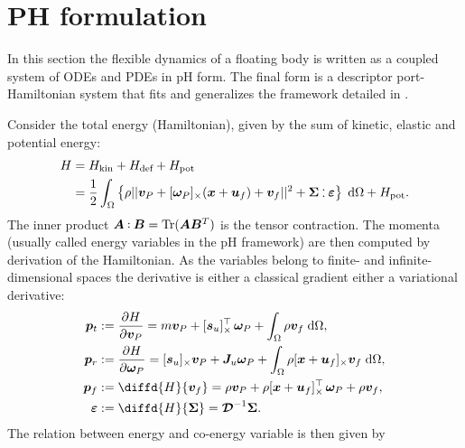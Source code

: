 \documentclass{svjour3}                     %
\DeclareMathOperator{\Tr}{Tr}
\newcommand{\crmat}[1]{\ensuremath{[#1]_{\times}}}
\def\onedot{$\mathsurround0pt\ldotp$}
\def\cddot{%
	\mathbin{\vcenter{\baselineskip.67ex
			\hbox{\onedot}\hbox{\onedot}}%
}}
\begin{document}
\section{PH formulation}
\label{sec:pH_fd}
In this section the flexible dynamics of a floating body is written as a coupled system of ODEs and PDEs in pH form. The final form is a descriptor port-Hamiltonian system that fits and generalizes the framework detailed in \cite{mehrmann2019structurepreserving}.  

Consider the total energy (Hamiltonian), given by the sum of kinetic, elastic and potential energy:
\begin{equation}
\begin{aligned}
H &= H_{\text{kin}} + H_{\text{def}} + H_{\text{pot}} \\
&= \frac{1}{2} \int_{\Omega} \left\{\rho ||\bm{v}_P + \crmat{\bm{\omega}_P} (\bm{x}+\bm{u}_f) + {\bm{v}}_f||^2 + \bm\Sigma \cddot \bm\varepsilon \right\}  \d{\Omega} + H_{\text{pot}}.
\end{aligned}
\end{equation}
The inner product $\bm{A} \cddot \bm{B} = \Tr(\bm{A} \bm{B}^T)$ is the tensor contraction.  
The momenta (usually called energy variables in the pH framework) are then computed by derivation of the Hamiltonian. As the variables belong to finite- and infinite-dimensional spaces the derivative is either a classical gradient either a variational derivative:
\begin{equation}
\label{eq:momenta}
\begin{aligned}
\bm{p}_t &:= \diffp{H}{\bm{v}_P} = m \bm{v}_P + \crmat{\bm{s}_u}^\top \, \bm\omega_P + \int_{\Omega} \rho \bm{v}_f \d{\Omega}, \\
\bm{p}_r &:= \diffp{H}{\bm\omega_P} = \crmat{\bm{s}_u} \bm{v}_P + \bm{J}_u \bm\omega_P + \int_{\Omega} \rho \crmat{\bm{x}+\bm{u}_f} \bm{v}_f \d{\Omega}, \\
\bm{p}_f &:= \diffd{H}{\bm{v}_f} = \rho \bm{v}_P + \rho \crmat{\bm{x}+\bm{u}_f}^\top \, \bm\omega_P + \rho \bm{v}_f, \\
\bm\varepsilon &:= \diffd{H}{\bm\Sigma} = \bm{\mathcal{D}}^{-1} \bm\Sigma.
\end{aligned}
\end{equation}
The relation between energy and co-energy variable is then given by
\end{document}
